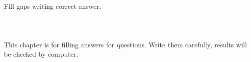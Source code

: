 \documentclass{report}
\begin{document}
\chapter{}
Fill gaps writing correct answer.\\\\




\chapter{}




\chapter{}
This chapter is for filling answers for questions. Write them carefully, results will be checked by computer.
\end{document}
